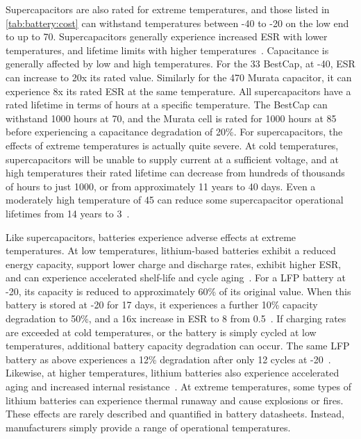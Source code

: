 Supercapacitors are also rated for extreme temperatures, and those listed in \cref{tab:battery:cost} can withstand temperatures between -40 to -20\ssi{\celsius} on the low end to up to 70\ssi{\celsius}. Supercapacitors generally experience increased ESR with lower temperatures, and lifetime limits with higher temperatures~\cite{murataCap,bestCap,kreczanik2013study,murataTech}. Capacitance is generally affected by low and high temperatures. For the 33\ssi{\milli\farad} BestCap, at -40\ssi{\celsius}, ESR can increase to 20x its rated value. Similarly for the 470\ssi{\milli\farad} Murata capacitor, it can experience 8x its rated ESR at the same temperature. All supercapacitors have a rated lifetime in terms of hours at a specific temperature. The BestCap can withstand 1000 hours at 70\ssi{\celsius}, and the Murata cell is rated for 1000 hours at 85\ssi{\celsius} before experiencing a capacitance degradation of 20\%. For supercapacitors, the effects of extreme temperatures is actually quite severe. 
At cold temperatures, supercapacitors will be unable to supply current at a sufficient voltage, and at high temperatures their rated lifetime can decrease from hundreds of thousands of hours to just 1000, or from approximately 11 years to 40 days. 
Even a moderately high temperature of 45\ssi{\celsius} can reduce some supercapacitor operational lifetimes from 14 years to 3~\cite{kreczanik2013study}.

Like supercapacitors, batteries experience adverse effects at extreme temperatures. At low temperatures, lithium-based batteries exhibit a reduced energy capacity, support lower charge and discharge rates, exhibit higher ESR, and can experience accelerated shelf-life and cycle aging~\cite{jaguemont2015lithium}. For a LFP battery at -20\ssi{\celsius}, its capacity is reduced to approximately 60\% of its original value. When this battery is stored at -20\ssi{\celsius} for 17 days, it experiences a further 10\% capacity degradation to 50\%, and a 16x increase in ESR to 8\ssi{\milli\ohm} from 0.5\ssi{\milli\ohm}~\cite{jaguemont2015lithium}.
If charging rates are exceeded at cold temperatures, or the battery is simply cycled at low temperatures, additional battery capacity degradation can occur. The same LFP battery as above experiences a 12\% degradation after only 12 cycles at -20\ssi{\celsius}~\cite{jaguemont2015lithium}.
Likewise, at higher temperatures, lithium batteries also experience accelerated aging and increased internal resistance~\cite{leng2015effect}. At extreme temperatures, some types of lithium batteries can experience thermal runaway and cause explosions or fires. These effects are rarely described and quantified in battery datasheets. Instead, manufacturers simply provide a range of operational temperatures.

